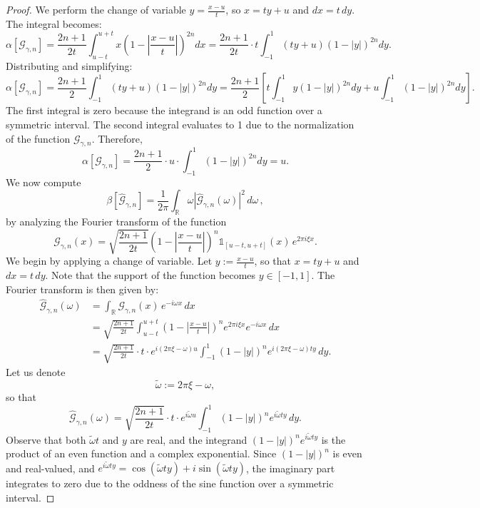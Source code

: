 \documentclass[preprint,hidelinks,authoryear]{elsarticle}
\theoremstyle{plain}
\theoremstyle{definition}
\theoremstyle{remark}
\begin{document}
\begin{proof}
We perform the change of variable $ y = \frac{x - u}{t} $, so $ x = t y + u $ and $ dx = t\,dy $. The integral becomes:
$$
\alpha[\mathcal{G}_{\gamma,n}] = \frac{2n+1}{2t} \int_{u - t}^{u + t} x \left(1 - \left| \frac{x - u}{t} \right| \right)^{2n} dx
= \frac{2n+1}{2t} \cdot t \int_{-1}^{1} (ty + u)(1 - |y|)^{2n} dy.
$$
Distributing and simplifying:
$$
\alpha[\mathcal{G}_{\gamma,n}] = \frac{2n+1}{2} \int_{-1}^{1} (ty + u)(1 - |y|)^{2n} dy
= \frac{2n+1}{2} \left[ t \int_{-1}^{1} y(1 - |y|)^{2n} dy + u \int_{-1}^{1} (1 - |y|)^{2n} dy \right].
$$
The first integral is zero because the integrand is an odd function over a symmetric interval. The second integral evaluates to 1 due to the normalization of the function $ \mathcal{G}_{\gamma,n} $. Therefore,
$$
\alpha[\mathcal{G}_{\gamma,n}] = \frac{2n+1}{2} \cdot u \cdot \int_{-1}^{1} (1 - |y|)^{2n} dy = u.
$$
We now compute
$$
\beta[\hat{\mathcal{G}}_{\gamma,n}] = \frac{1}{2\pi} \int_{\mathbb{R}} \omega |\hat{\mathcal{G}}_{\gamma,n}(\omega)|^2 \, d\omega\, ,
$$
by analyzing the Fourier transform of the function
$$
\mathcal{G}_{\gamma,n}(x) = \sqrt{\frac{2n+1}{2t}} \left(1 - \left| \frac{x - u}{t} \right| \right)^n \mathds{1}_{[u - t, u + t]}(x) \, e^{2\pi i \xi x}.
$$
We begin by applying a change of variable. Let $ y := \frac{x - u}{t} $, so that $ x = t y + u $ and $ dx = t \, dy $. Note that the support of the function becomes $ y \in [-1,1] $. The Fourier transform is then given by:
$$
\begin{aligned}
\hat{\mathcal{G}}_{\gamma,n}(\omega)
&= \int_{\mathbb{R}} \mathcal{G}_{\gamma,n}(x) \, e^{-i \omega x} \, dx \\
&= \sqrt{\frac{2n+1}{2t}} \int_{u - t}^{u + t} \left(1 - \left| \frac{x - u}{t} \right| \right)^n e^{2\pi i \xi x} e^{-i \omega x} \, dx \\
&= \sqrt{\frac{2n+1}{2t}} \cdot t \cdot e^{i(2\pi \xi - \omega)u} \int_{-1}^{1} (1 - |y|)^n e^{i(2\pi \xi - \omega)t y} \, dy.
\end{aligned}
$$
Let us denote
$$
\tilde{\omega} := 2\pi \xi - \omega,
$$
so that
$$
\hat{\mathcal{G}}_{\gamma,n}(\omega) = \sqrt{\frac{2n+1}{2t}} \cdot t \cdot e^{i \tilde{\omega} u} \int_{-1}^{1} (1 - |y|)^n e^{i \tilde{\omega} t y} \, dy.
$$
Observe that both $ \tilde{\omega} t $ and $ y $ are real, and the integrand $ (1 - |y|)^n e^{i \tilde{\omega} t y} $ is the product of an even function and a complex exponential. Since $ (1 - |y|)^n $ is even and real-valued, and $ e^{i \tilde{\omega} t y} = \cos(\tilde{\omega} t y) + i \sin(\tilde{\omega} t y) $, the imaginary part integrates to zero due to the oddness of the sine function over a symmetric interval.


\end{proof}
\end{document}
